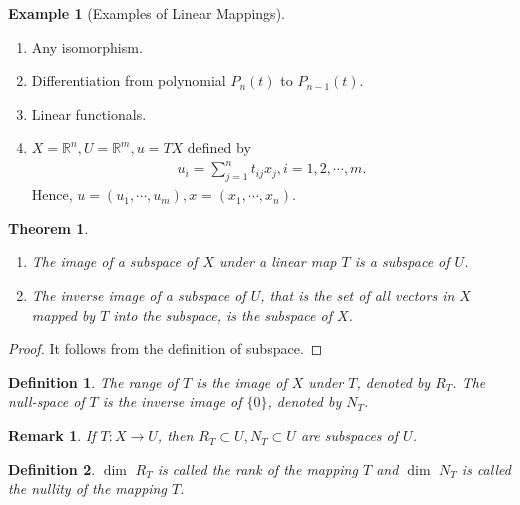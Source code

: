 \documentclass[11pt]{book}
\newtheorem{definition}{Definition}[chapter]
\newtheorem{theorem}{Theorem}[chapter]
\newtheorem{remark}{Remark}[chapter]
\theoremstyle{definition}
\newtheorem{example}{Example}[chapter]
\numberwithin{equation}{chapter}
\begin{document}
\medskip

\begin{example}[Examples of Linear Mappings]
~\begin{enumerate}[label=(\arabic*)]
    \item Any isomorphism.
    \item Differentiation from polynomial $P_n(t)$ to $P_{n-1}(t)$.
    \item Linear functionals.
    \item $X=\mathbb{R}^n, U=\mathbb{R}^m, u = TX$ defined by
    \begin{align*}
        u_i = \sum^n_{j=1}t_{ij}x_j, i = 1,2,\cdots,m.
    \end{align*}
    Hence, $u = (u_1,\cdots,u_m), x = (x_1,\cdots,x_n)$.
\end{enumerate}
\end{example}

\medskip

\begin{theorem}
~\begin{enumerate}[label=(\alph*)]
    \item The image of a subspace of $X$ under a linear map $T$ is a subspace of $U$.
    \item The inverse image of a subspace of $U$, that is the set of all vectors in $X$ mapped by $T$ into the subspace, is the subspace of $X$.
\end{enumerate}
\end{theorem}
\begin{proof}
It follows from the definition of subspace.
\end{proof}

\medskip

\begin{definition}
The range of $T$ is the image of $X$ under $T$, denoted by $R_T$. The null-space of $T$ is the inverse image of $\{0\}$, denoted by $N_T$.
\end{definition}
\begin{remark}
If $T:X\to U$, then $R_T\subset U, N_T\subset U$ are subspaces of $U$.
\end{remark}

\medskip

\begin{definition}
$ \dim \,\,R_T$ is called the rank of the mapping $T$ and $ \dim \,\,N_T$ is called the nullity of the mapping $T$.
\end{definition}

\medskip
\end{document}
